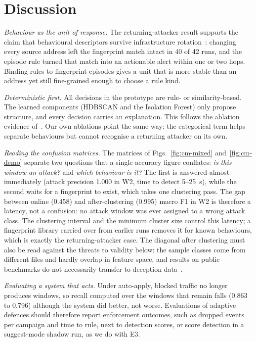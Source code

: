 \documentclass[conference]{IEEEtran}
\begin{document}
\section{Discussion}\label{sec:discussion}
\textit{Behaviour as the unit of response.} The returning-attacker result supports the claim that behavioural descriptors survive infrastructure rotation~\cite{savage2025,lim2026}: changing every source address left the fingerprint match intact in 40 of 42 runs, and the episode rule turned that match into an actionable alert within one or two hops. Binding rules to fingerprint episodes gives a unit that is more stable than an address yet still fine-grained enough to choose a rule kind.

\textit{Deterministic first.} All decisions in the prototype are rule- or similarity-based. The learned components (HDBSCAN and the Isolation Forest) only propose structure, and every decision carries an explanation. This follows the ablation evidence of~\cite{oliveira2026}. Our own ablations point the same way: the categorical term helps separate behaviours but cannot recognise a returning attacker on its own.

\textit{Reading the confusion matrices.} The matrices of Figs.~\ref{fig:cm-mixed} and~\ref{fig:cm-demo} separate two questions that a single accuracy figure conflates: \emph{is this window an attack?} and \emph{which behaviour is it?} The first is answered almost immediately (attack precision 1.000 in W2, time to detect 5--25~s), while the second waits for a fingerprint to exist, which takes one clustering pass. The gap between online (0.458) and after-clustering (0.995) macro F1 in W2 is therefore a latency, not a confusion: no attack window was ever assigned to a wrong attack class. The clustering interval and the minimum cluster size control this latency; a fingerprint library carried over from earlier runs removes it for known behaviours, which is exactly the returning-attacker case. The diagonal after clustering must also be read against the threats to validity below: the sample classes come from different files and hardly overlap in feature space, and results on public benchmarks do not necessarily transfer to deception data~\cite{beltran2026}.

\textit{Evaluating a system that acts.} Under auto-apply, blocked traffic no longer produces windows, so recall computed over the windows that remain falls (0.863 to 0.796) although the system did better, not worse. Evaluations of adaptive defences should therefore report enforcement outcomes, such as dropped events per campaign and time to rule, next to detection scores, or score detection in a suggest-mode shadow run, as we do with E3.
\end{document}
